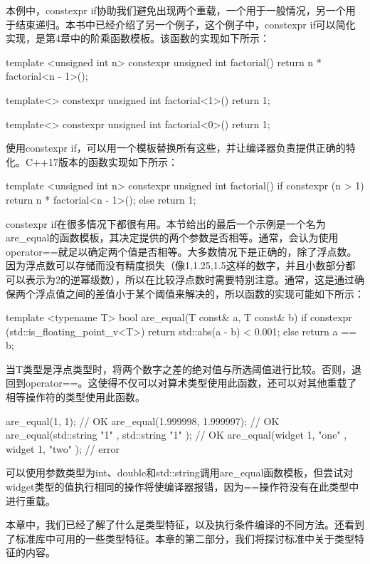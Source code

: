 本例中，constexpr if协助我们避免出现两个重载，一个用于一般情况，另一个用于结束递归。本书中已经介绍了另一个例子，这个例子中，constexpr if可以简化实现，是第4章中的阶乘函数模板。该函数的实现如下所示：

\begin{cppcode}
template <unsigned int n>
constexpr unsigned int factorial()
{
	return n * factorial<n - 1>();
}

template<>
constexpr unsigned int factorial<1>() { return 1; }

template<>
constexpr unsigned int factorial<0>() { return 1; }
\end{cppcode}

使用constexpr if，可以用一个模板替换所有这些，并让编译器负责提供正确的特化。C++17版本的函数实现如下所示：

\begin{cppcode}
template <unsigned int n>
constexpr unsigned int factorial()
{
	if constexpr (n > 1)
		return n * factorial<n - 1>();
	else
		return 1;
}
\end{cppcode}

constexpr if在很多情况下都很有用。本节给出的最后一个示例是一个名为are_equal的函数模板，其决定提供的两个参数是否相等。通常，会认为使用operator==就足以确定两个值是否相等。大多数情况下是正确的，除了浮点数。因为浮点数可以存储而没有精度损失（像1,1.25,1.5这样的数字，并且小数部分都可以表示为2的逆幂级数），所以在比较浮点数时需要特别注意。通常，这是通过确保两个浮点值之间的差值小于某个阈值来解决的，所以函数的实现可能如下所示：

\begin{cppcode}
template <typename T>
bool are_equal(T const& a, T const& b)
{
	if constexpr (std::is_floating_point_v<T>)
		return std::abs(a - b) < 0.001;
	else
		return a == b;
}
\end{cppcode}

当T类型是浮点类型时，将两个数字之差的绝对值与所选阈值进行比较。否则，退回到operator==。这使得不仅可以对算术类型使用此函数，还可以对其他重载了相等操作符的类型使用此函数。

\begin{cppcode}
are_equal(1, 1); // OK
are_equal(1.999998, 1.999997); // OK
are_equal(std::string{ "1" }, std::string{ "1" }); // OK
are_equal(widget{ 1, "one" }, widget{ 1, "two" }); // error
\end{cppcode}

可以使用参数类型为int、double和std::string调用are_equal函数模板，但尝试对widget类型的值执行相同的操作将使编译器报错，因为==操作符没有在此类型中进行重载。

本章中，我们已经了解了什么是类型特征，以及执行条件编译的不同方法。还看到了标准库中可用的一些类型特征。本章的第二部分，我们将探讨标准中关于类型特征的内容。






































